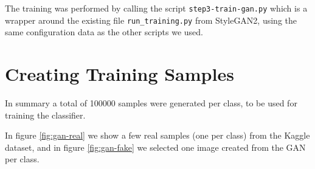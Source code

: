 \documentclass[sigconf,nonacm]{acmart}
\begin{document}
The training was performed by calling the script \texttt{step3-train-gan.py}
which is a wrapper around the existing file \texttt{run\_training.py}
from StyleGAN2, using the same configuration data as the other scripts we used.

\section{Creating Training Samples}

In summary a total of \SI{100000}{} samples were generated per class, to be
used for training the classifier.

In figure \ref{fig:gan-real} we show a few real samples (one per class) from
the Kaggle dataset, and in figure \ref{fig:gan-fake} we selected one
image created from the GAN per class.
\end{document}
